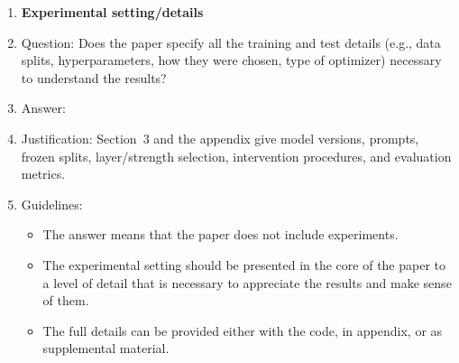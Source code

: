\documentclass[
]{article}
\begin{document}
\begin{enumerate}
\item {\bf Experimental setting/details}
    \item[] Question: Does the paper specify all the training and test details (e.g., data splits, hyperparameters, how they were chosen, type of optimizer) necessary to understand the results?
    \item[] Answer: \answerYes{} %
    \item[] Justification: Section~3 and the appendix give model versions, prompts, frozen splits, layer/strength selection, intervention procedures, and evaluation metrics.
    \item[] Guidelines:
    \begin{itemize}
        \item The answer \answerNA{} means that the paper does not include experiments.
        \item The experimental setting should be presented in the core of the paper to a level of detail that is necessary to appreciate the results and make sense of them.
        \item The full details can be provided either with the code, in appendix, or as supplemental material.
    \end{itemize}


\end{enumerate}
\end{document}
